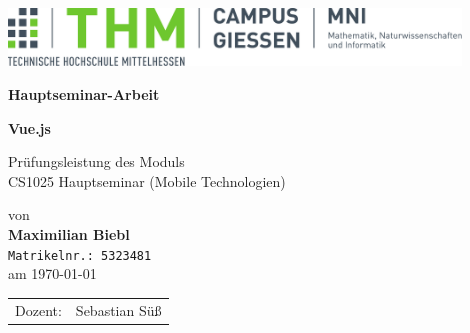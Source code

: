 \documentclass[%
    BCOR=8.25mm,         %
    DIV=12,              %
    parskip=half,                 %
    bibliography=totoc,     %
    headsepline=on,      %
]{scrbook}
\begin{document}
    \frontmatter

    \begin{titlepage}
        \begin{center}
            \includegraphics[width=0.9\textwidth]{img/mni-logo}

            \vspace{5cm}

            \Large\textbf{\sffamily Hauptseminar-Arbeit}

            \vspace{1cm}

            \huge\textbf{\sffamily Vue.js}

            \normalsize
            \vspace{1cm}

            Prüfungsleistung des Moduls \\
            CS1025 Hauptseminar (Mobile Technologien)

            von \\[1cm]

            \textbf{Maximilian Biebl} \\ \texttt{Matrikelnr.: 5323481}\\ [.5cm]
            am \today
        \end{center}
        \vfill
        \begin{tabular}{ll}
            Dozent: & Sebastian Süß
        \end{tabular}
    \end{titlepage}
    \cleardoubleemptypage
\end{document}

